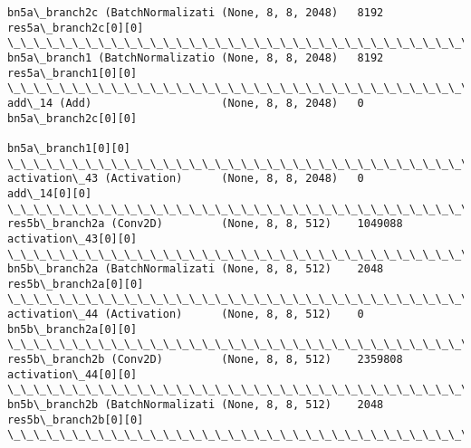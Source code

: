 \documentclass[11pt]{article}
\begin{document}
\begin{Verbatim}[commandchars=\\\{\}]
bn5a\_branch2c (BatchNormalizati (None, 8, 8, 2048)   8192        res5a\_branch2c[0][0]             
\_\_\_\_\_\_\_\_\_\_\_\_\_\_\_\_\_\_\_\_\_\_\_\_\_\_\_\_\_\_\_\_\_\_\_\_\_\_\_\_\_\_\_\_\_\_\_\_\_\_\_\_\_\_\_\_\_\_\_\_\_\_\_\_\_\_\_\_\_\_\_\_\_\_\_\_\_\_\_\_\_\_\_\_\_\_\_\_\_\_\_\_\_\_\_\_\_\_
bn5a\_branch1 (BatchNormalizatio (None, 8, 8, 2048)   8192        res5a\_branch1[0][0]              
\_\_\_\_\_\_\_\_\_\_\_\_\_\_\_\_\_\_\_\_\_\_\_\_\_\_\_\_\_\_\_\_\_\_\_\_\_\_\_\_\_\_\_\_\_\_\_\_\_\_\_\_\_\_\_\_\_\_\_\_\_\_\_\_\_\_\_\_\_\_\_\_\_\_\_\_\_\_\_\_\_\_\_\_\_\_\_\_\_\_\_\_\_\_\_\_\_\_
add\_14 (Add)                    (None, 8, 8, 2048)   0           bn5a\_branch2c[0][0]              
                                                                 bn5a\_branch1[0][0]               
\_\_\_\_\_\_\_\_\_\_\_\_\_\_\_\_\_\_\_\_\_\_\_\_\_\_\_\_\_\_\_\_\_\_\_\_\_\_\_\_\_\_\_\_\_\_\_\_\_\_\_\_\_\_\_\_\_\_\_\_\_\_\_\_\_\_\_\_\_\_\_\_\_\_\_\_\_\_\_\_\_\_\_\_\_\_\_\_\_\_\_\_\_\_\_\_\_\_
activation\_43 (Activation)      (None, 8, 8, 2048)   0           add\_14[0][0]                     
\_\_\_\_\_\_\_\_\_\_\_\_\_\_\_\_\_\_\_\_\_\_\_\_\_\_\_\_\_\_\_\_\_\_\_\_\_\_\_\_\_\_\_\_\_\_\_\_\_\_\_\_\_\_\_\_\_\_\_\_\_\_\_\_\_\_\_\_\_\_\_\_\_\_\_\_\_\_\_\_\_\_\_\_\_\_\_\_\_\_\_\_\_\_\_\_\_\_
res5b\_branch2a (Conv2D)         (None, 8, 8, 512)    1049088     activation\_43[0][0]              
\_\_\_\_\_\_\_\_\_\_\_\_\_\_\_\_\_\_\_\_\_\_\_\_\_\_\_\_\_\_\_\_\_\_\_\_\_\_\_\_\_\_\_\_\_\_\_\_\_\_\_\_\_\_\_\_\_\_\_\_\_\_\_\_\_\_\_\_\_\_\_\_\_\_\_\_\_\_\_\_\_\_\_\_\_\_\_\_\_\_\_\_\_\_\_\_\_\_
bn5b\_branch2a (BatchNormalizati (None, 8, 8, 512)    2048        res5b\_branch2a[0][0]             
\_\_\_\_\_\_\_\_\_\_\_\_\_\_\_\_\_\_\_\_\_\_\_\_\_\_\_\_\_\_\_\_\_\_\_\_\_\_\_\_\_\_\_\_\_\_\_\_\_\_\_\_\_\_\_\_\_\_\_\_\_\_\_\_\_\_\_\_\_\_\_\_\_\_\_\_\_\_\_\_\_\_\_\_\_\_\_\_\_\_\_\_\_\_\_\_\_\_
activation\_44 (Activation)      (None, 8, 8, 512)    0           bn5b\_branch2a[0][0]              
\_\_\_\_\_\_\_\_\_\_\_\_\_\_\_\_\_\_\_\_\_\_\_\_\_\_\_\_\_\_\_\_\_\_\_\_\_\_\_\_\_\_\_\_\_\_\_\_\_\_\_\_\_\_\_\_\_\_\_\_\_\_\_\_\_\_\_\_\_\_\_\_\_\_\_\_\_\_\_\_\_\_\_\_\_\_\_\_\_\_\_\_\_\_\_\_\_\_
res5b\_branch2b (Conv2D)         (None, 8, 8, 512)    2359808     activation\_44[0][0]              
\_\_\_\_\_\_\_\_\_\_\_\_\_\_\_\_\_\_\_\_\_\_\_\_\_\_\_\_\_\_\_\_\_\_\_\_\_\_\_\_\_\_\_\_\_\_\_\_\_\_\_\_\_\_\_\_\_\_\_\_\_\_\_\_\_\_\_\_\_\_\_\_\_\_\_\_\_\_\_\_\_\_\_\_\_\_\_\_\_\_\_\_\_\_\_\_\_\_
bn5b\_branch2b (BatchNormalizati (None, 8, 8, 512)    2048        res5b\_branch2b[0][0]             
\_\_\_\_\_\_\_\_\_\_\_\_\_\_\_\_\_\_\_\_\_\_\_\_\_\_\_\_\_\_\_\_\_\_\_\_\_\_\_\_\_\_\_\_\_\_\_\_\_\_\_\_\_\_\_\_\_\_\_\_\_\_\_\_\_\_\_\_\_\_\_\_\_\_\_\_\_\_\_\_\_\_\_\_\_\_\_\_\_\_\_\_\_\_\_\_\_\_

\end{Verbatim}
\end{document}
